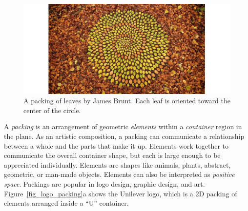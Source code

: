 \begin{figure}
\centering
\includegraphics[width=1.0\textwidth]{figures/intro/woodland.jpg} 
\caption[A packing in art]
{\label{fig_woodland} 
\newtext
{
A packing of leaves by James Brunt. Each leaf is oriented toward the center of the circle.
}
 }
\end{figure}





\newtext
{
A \textit{packing} is an arrangement of geometric
\textit{elements} within a \textit{container} region in the plane.
As an artistic composition, 
a packing can communicate a relationship between a whole and the parts that make it up.
Elements work together to communicate the overall container shape,
but each is large enough to be appreciated individually.
Elements are shapes like animals, plants, abstract, geometric, or man-made objects.
Elements can also be interpreted as \textit{positive space}.
Packings are popular in logo design, graphic design, and art.
Figure~\ref{fig_logo_packing}a shows the Unilever logo,
which is a 2D packing of elements arranged inside a ``U'' container.}

